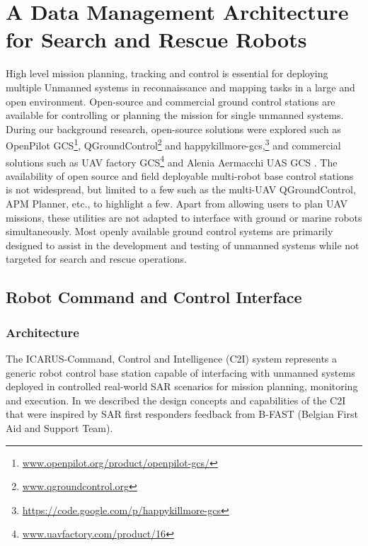 \documentclass{article}
\begin{document}
\section{A Data Management Architecture for Search and Rescue Robots}
High level mission planning, tracking and control is essential for deploying multiple Unmanned systems in reconnaissance and mapping tasks in a large and open environment.
Open-source and commercial ground control stations are available for controlling or planning the mission for single unmanned systems.
During our background research, open-source solutions were explored such as OpenPilot GCS\footnote{\url{www.openpilot.org/product/openpilot-gcs/}}, QGroundControl\footnote{\url{www.qgroundcontrol.org}} and happykillmore-gcs,\footnote{\url{https://code.google.com/p/happykillmore-gcs}} and commercial solutions such as UAV factory GCS\footnote{\url{www.uavfactory.com/product/16}} and  Alenia Aermacchi UAS GCS \cite{JIR_GCS}.
The availability of open source and field deployable multi-robot base control stations is not widespread, but limited to a few such as the multi-UAV QGroundControl, APM Planner, etc., to highlight a few.
Apart from allowing users to plan UAV missions, these utilities are not adapted to interface with ground or marine robots simultaneously.
Most openly available ground control systems are primarily designed to assist in the development and testing of unmanned systems while not targeted for search and rescue operations.
\subsection{Robot Command and Control Interface}
\subsubsection{Architecture}
The ICARUS-Command, Control and Intelligence (C2I) system represents a generic robot control base station capable of interfacing with unmanned systems deployed in controlled real-world SAR scenarios for mission planning, monitoring and execution.
In \cite{sgo-ssrr} we described the design concepts and capabilities of the C2I that were inspired by SAR first responders feedback from B-FAST (Belgian First Aid and Support Team).
\end{document}
